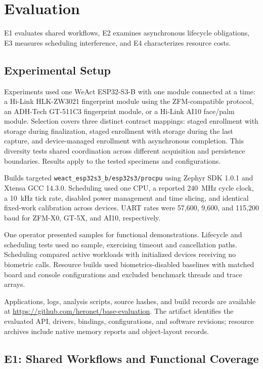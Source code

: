 \section{Evaluation}
\label{sec:evaluation}

E1 evaluates shared workflows, E2 examines asynchronous lifecycle obligations, E3 measures scheduling interference, and E4 characterizes resource costs.

\subsection{Experimental Setup}
\label{sec:eval_setup}

Experiments used one WeAct ESP32-S3-B with one module connected at a time: a Hi-Link HLK-ZW3021 fingerprint module using the ZFM-compatible protocol, an ADH-Tech GT-511C3 fingerprint module, or a Hi-Link AI10 face/palm module. Selection covers three distinct contract mappings: staged enrollment with storage during finalization, staged enrollment with storage during the last capture, and device-managed enrollment with asynchronous completion. This diversity tests shared coordination across different acquisition and persistence boundaries. Results apply to the tested specimens and configurations.

Builds targeted \texttt{weact\_esp32s3\_b/\allowbreak{}esp32s3/\allowbreak{}procpu} using Zephyr SDK 1.0.1 and Xtensa GCC 14.3.0. Scheduling used one CPU, a reported 240~MHz cycle clock, a 10~kHz tick rate, disabled power management and time slicing, and identical fixed-work calibration across devices. UART rates were 57,600, 9,600, and 115,200 baud for ZFM-X0, GT-5X, and AI10, respectively.

One operator presented samples for functional demonstrations. Lifecycle and scheduling tests used no sample, exercising timeout and cancellation paths. Scheduling compared active workloads with initialized devices receiving no biometric calls. Resource builds used biometrics-disabled baselines with matched board and console configurations and excluded benchmark threads and trace arrays.

Applications, logs, analysis scripts, source hashes, and build records are available at \url{https://github.com/heronet/base-evaluation}. The artifact identifies the evaluated API, drivers, bindings, configurations, and software revisions; resource archives include native memory reports and object-layout records.

\subsection{E1: Shared Workflows and Functional Coverage}
\label{sec:eval_functional}

